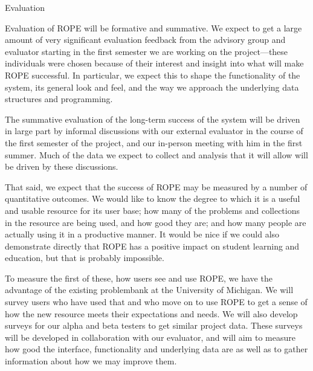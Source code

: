 \documentclass[11pt]{article}
\begin{document}
\begin{section}{Evaluation}

Evaluation of ROPE will be formative and summative.  We expect to get a
large amount of very significant evaluation feedback from the advisory
group and evaluator starting in the first semester we are working on the
project---these individuals were chosen because of their interest and
insight into what will make ROPE successful.  In particular, we expect
this to shape the functionality of the system, its general look and feel,
and the way we approach the underlying data structures and programming.  

The summative evaluation of the long-term success of the system will be
driven in large part by informal discussions with our external evaluator
in the course of the first semester of the project, and our in-person
meeting with him in the first summer.  Much of the data we expect to
collect and analysis that it will allow will be driven by these
discussions.  


That said, we expect that the success of ROPE may be measured by a number
of quantitative outcomes.  We would like to know the degree to which it is
a useful and usable resource for its user base; how many of the problems
and collections in the resource are being used, and how good they are; and
how many people are actually using it in a productive manner.  It would be
nice if we could also demonstrate directly that ROPE has a positive impact
on student learning and education, but that is probably impossible.

To measure the first of these, how users see and use ROPE, we have the
advantage of the existing problembank at the University of Michigan.  We
will survey users who have used that and who move on to use ROPE to get a
sense of how the new resource meets their expectations and needs.  We will
also develop surveys for our alpha and beta testers to get similar project
data.  These surveys will be developed in collaboration with our
evaluator, and will aim to measure how good the interface, functionality
and underlying data are as well as to gather information about how we may
improve them.


\end{section}
\end{document}
